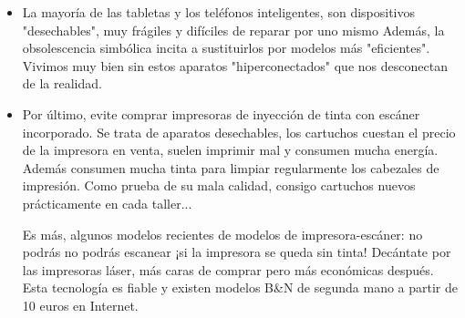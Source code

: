 \documentclass[a5paper,twoside,openany]{book}
\begin{document}
\begin{itemize}
\item La mayoría de las tabletas y los teléfonos inteligentes, son dispositivos "desechables", muy frágiles y difíciles de reparar por uno mismo Además, la obsolescencia simbólica incita a sustituirlos por modelos más "eficientes". Vivimos muy bien sin estos aparatos "hiperconectados" que nos desconectan de la realidad.

\item Por último, evite comprar impresoras de inyección de tinta con escáner incorporado. Se trata de aparatos desechables, los cartuchos cuestan el precio de la impresora en venta, suelen imprimir mal y consumen mucha energía. Además consumen mucha tinta para limpiar regularmente los cabezales de impresión. Como prueba de su mala calidad, consigo cartuchos nuevos prácticamente en cada taller...

Es más, algunos modelos recientes de modelos de impresora-escáner: no podrás no podrás escanear ¡si la impresora se queda sin tinta! Decántate por las impresoras láser, más caras de comprar pero más económicas después. Esta tecnología es fiable y existen modelos B\&N de segunda mano a partir de 10 euros en Internet.


\end{itemize}
\end{document}
